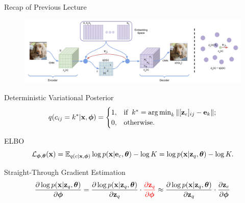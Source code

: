 \documentclass{beamer}
\begin{document}
\begin{frame}{Recap of Previous Lecture}
	\begin{figure}
		\centering
		\includegraphics[width=0.85\linewidth]{figs/vqvae}
	\end{figure}
	\vspace{-0.3cm}
	\begin{block}{Deterministic Variational Posterior}
		\vspace{-0.3cm}
		\[
			q(c_{ij} = k^* | \mathbf{x}, \boldsymbol{\phi}) = \begin{cases}
				1,  & \text{if}\;\; k^* = \operatorname*{arg\,min}_k \| [\mathbf{z}_e]_{ij} - \mathbf{e}_k \|; \\
				0,  & \text{otherwise}.
			\end{cases}
		\]
		\vspace{-0.5cm}
	\end{block}
	\begin{block}{ELBO}
		\vspace{-0.6cm}
		\[
			\mathcal{L}_{\boldsymbol{\phi}, \boldsymbol{\theta}}(\mathbf{x})  = \mathbb{E}_{q(c | \mathbf{x}, \boldsymbol{\phi})} \log p(\mathbf{x} | \mathbf{e}_{c} , \boldsymbol{\theta}) - \log K =  \log p(\mathbf{x} | \mathbf{z}_q, \boldsymbol{\theta}) - \log K.
		\]
		\vspace{-0.6cm}
	\end{block}
	\begin{block}{Straight-Through Gradient Estimation}
		\vspace{-0.6cm}
		\[
			\frac{\partial \log p(\mathbf{x} | \mathbf{z}_q , \boldsymbol{\theta})}{\partial \boldsymbol{\phi}} = \frac{\partial \log p(\mathbf{x} | \mathbf{z}_q, \boldsymbol{\theta})}{\partial \mathbf{z}_q} \cdot {\color{red}\frac{\partial \mathbf{z}_q}{\partial \boldsymbol{\phi}}} \approx \frac{\partial \log p(\mathbf{x} | \mathbf{z}_q, \boldsymbol{\theta})}{\partial \mathbf{z}_q} \cdot \frac{\partial \mathbf{z}_e}{\partial \boldsymbol{\phi}}
		\]
	\end{block}
\end{frame}
\end{document}
